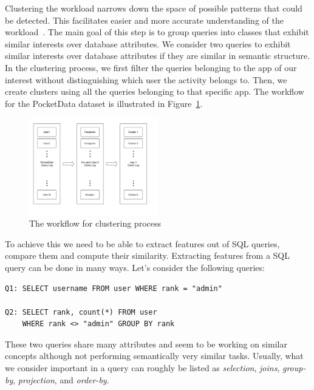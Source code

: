 Clustering the workload narrows down the space of possible patterns that could be detected. This facilitates easier and more accurate understanding of the workload~\cite{pavlo2017self}. The main goal of this step is to group queries into classes that exhibit similar interests over database attributes. We consider two queries to exhibit similar interests over database attributes if they are similar in semantic structure. In the clustering process, we first filter the queries belonging to the app of our interest without distinguishing which user the activity belongs to. Then, we create clusters using all the queries belonging to that specific app. The workflow for the PocketData dataset is illustrated in Figure~\ref{fig:clusteringWorkflow}.

\begin{figure}[h!]
    \centering
    \includegraphics[width=0.5\textwidth]{graphics/clustering}
    \caption{The workflow for clustering process}
    \label{fig:clusteringWorkflow}
\end{figure}

To achieve this we need to be able to extract features out of SQL queries, compare them and compute their similarity. Extracting features from a SQL query can be done in many ways. Let's consider the following queries:
\begin{verbatim}
Q1: SELECT username FROM user WHERE rank = "admin"
 
Q2: SELECT rank, count(*) FROM user
    WHERE rank <> "admin" GROUP BY rank
\end{verbatim}

These two queries share many attributes and seem to be working on similar concepts although not performing semantically very similar tasks. Usually, what we consider important in a query can roughly be listed as \textit{selection}, \textit{joins}, \textit{group-by}, \textit{projection}, and \textit{order-by}.


